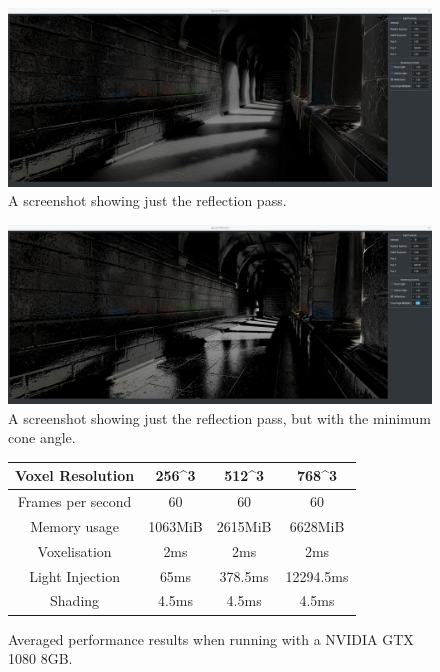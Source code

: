 \documentclass[]{acmsiggraph}
\begin{document}
\begin{figure}[htbp]\centering
 \includegraphics[width=1.0\linewidth]{images/reflection_only.png}
 \caption{\label{fig:reference}A screenshot showing just the reflection pass.}
\end{figure}

\begin{figure}[htbp]\centering
 \includegraphics[width=1.0\linewidth]{images/reflection_only_no_roughness.png}
 \caption{\label{fig:reference}A screenshot showing just the reflection pass, but with the minimum cone angle.}
\end{figure}

\begin{figure}[htbp]\centering
\begin{center}
 \begin{tabular}{|c|c|c|c|}
 \hline
 Voxel Resolution & 256^3 & 512^3 & 768^3 \\
 \hline
 \hline
 Frames per second & 60 & 60 & 60 \\
 \hline
 Memory usage & 1063MiB & 2615MiB & 6628MiB \\
 \hline
 Voxelisation & 2ms & 2ms & 2ms \\
 \hline
 Light Injection & 65ms & 378.5ms & 12294.5ms\\
 \hline
 Shading & 4.5ms & 4.5ms & 4.5ms \\
 \hline
 \end{tabular}
 \caption{\label{fig:reference}Averaged performance results when running with a NVIDIA GTX 1080 8GB.}
\end{center}
\end{figure}
\end{document}
